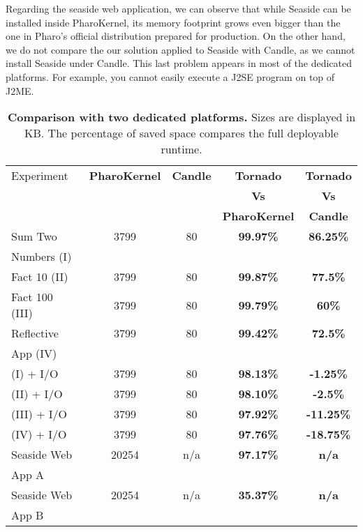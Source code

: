 Regarding the seaside web application, we can observe that while Seaside can be installed inside PharoKernel, its memory footprint grows even bigger than the one in Pharo's official distribution prepared for production. On the other hand, we do not compare the our solution applied to Seaside with Candle, as we cannot install Seaside under Candle. This last problem appears in most of the dedicated platforms. For example, you cannot easily execute a J2SE program on top of J2ME. 

\begin{table}[ht]
 	\centering
 	\begin{tabular}{lcccc}
		\toprule
			Experiment
 			& \textbf{PharoKernel}
			& \textbf{Candle}
			& \textbf{Tornado}
			& \textbf{Tornado}\\
			
 			& 
			& 
			& \textbf{Vs}
			& \textbf{Vs}\\
			
 			& 
			& 
			& \textbf{PharoKernel}
			& \textbf{Candle}\\
		\toprule
		Sum Two
 			&  3799 & 80 & \textbf{99.97\%} & \textbf{86.25\%}\\
		Numbers (I)
 			& &&&\\
		\midrule
		Fact 10 (II)
 			& 3799 & 80 & \textbf{99.87\%} & \textbf{77.5\%}\\
		\midrule
		Fact 100 (III)
 			& 3799 & 80 & \textbf{99.79\%} & \textbf{60\%}\\
		\midrule
		Reflective
 			& 3799 & 80 & \textbf{99.42\%} & \textbf{72.5\%}\\
		App (IV)&&&&\\
		\midrule
		(I) + I/O
 			& 3799 & 80 & \textbf{98.13\%} & \textbf{-1.25\%}\\
		\midrule
		(II) + I/O
 			& 3799 & 80 & \textbf{98.10\%} & \textbf{-2.5\%}\\
		\midrule
		(III) + I/O
 			& 3799 & 80 & \textbf{97.92\%} & \textbf{-11.25\%}\\
		\midrule
		(IV) + I/O
 			& 3799 & 80 & \textbf{97.76\%} & \textbf{-18.75\%}\\
		\midrule
		Seaside Web
 			& 20254 & n/a & \textbf{97.17\%}  & \textbf{n/a}\\
		App A&&&&\\
		\midrule
		Seaside Web
 			& 20254 & n/a & \textbf{35.37\%}  & \textbf{n/a}\\
		App B&&&&\\
		\bottomrule
 	\end{tabular}
 	\caption{\textbf{Comparison with two dedicated platforms.} Sizes are displayed in KB. The percentage of saved space compares the full deployable runtime.}
 	\label{tb:results_dedicated}
 \end{table}

